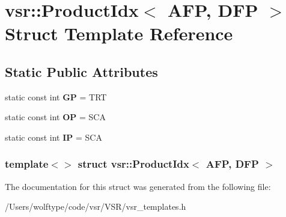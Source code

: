 \hypertarget{structvsr_1_1_product_idx_3_01_a_f_p_00_01_d_f_p_01_4}{\section{vsr\-:\-:Product\-Idx$<$ A\-F\-P, D\-F\-P $>$ Struct Template Reference}
\label{structvsr_1_1_product_idx_3_01_a_f_p_00_01_d_f_p_01_4}
}
\subsection*{Static Public Attributes}
\begin{DoxyCompactItemize}
\item 
\hypertarget{structvsr_1_1_product_idx_3_01_a_f_p_00_01_d_f_p_01_4_a13a3dd673d59a8d353c5ce4434e9bfd4}{static const int {\bfseries G\-P} = T\-R\-T}\label{structvsr_1_1_product_idx_3_01_a_f_p_00_01_d_f_p_01_4_a13a3dd673d59a8d353c5ce4434e9bfd4}

\item 
\hypertarget{structvsr_1_1_product_idx_3_01_a_f_p_00_01_d_f_p_01_4_a09f2d15d7b5c17c2e2820e3e7551365d}{static const int {\bfseries O\-P} = S\-C\-A}\label{structvsr_1_1_product_idx_3_01_a_f_p_00_01_d_f_p_01_4_a09f2d15d7b5c17c2e2820e3e7551365d}

\item 
\hypertarget{structvsr_1_1_product_idx_3_01_a_f_p_00_01_d_f_p_01_4_a510cfa09640b6476f29a7277b993d5ab}{static const int {\bfseries I\-P} = S\-C\-A}\label{structvsr_1_1_product_idx_3_01_a_f_p_00_01_d_f_p_01_4_a510cfa09640b6476f29a7277b993d5ab}

\end{DoxyCompactItemize}
\subsubsection*{template$<$$>$ struct vsr\-::\-Product\-Idx$<$ A\-F\-P, D\-F\-P $>$}



The documentation for this struct was generated from the following file\-:\begin{DoxyCompactItemize}
\item 
/\-Users/wolftype/code/vsr/\-V\-S\-R/vsr\-\_\-templates.\-h\end{DoxyCompactItemize}
